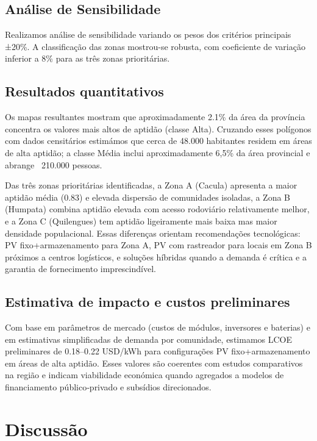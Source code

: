 \documentclass[12pt, a4paper]{article}
\begin{document}
\subsection{Análise de Sensibilidade}

Realizamos análise de sensibilidade variando os pesos dos critérios principais ±20\%. A classificação das zonas mostrou-se robusta, com coeficiente de variação inferior a 8\% para as três zonas prioritárias.

\subsection{Resultados quantitativos}

Os mapas resultantes mostram que aproximadamente 2.1\% da área da província concentra os valores mais altos de aptidão (classe Alta). Cruzando esses polígonos com dados censitários estimámos que cerca de 48.000 habitantes residem em áreas de alta aptidão; a classe Média inclui aproximadamente 6,5\% da área provincial e abrange ~210.000 pessoas.

Das três zonas prioritárias identificadas, a Zona A (Cacula) apresenta a maior aptidão média (0.83) e elevada dispersão de comunidades isoladas, a Zona B (Humpata) combina aptidão elevada com acesso rodoviário relativamente melhor, e a Zona C (Quilengues) tem aptidão ligeiramente mais baixa mas maior densidade populacional. Essas diferenças orientam recomendações tecnológicas: PV fixo+armazenamento para Zona A, PV com rastreador para locais em Zona B próximos a centros logísticos, e soluções híbridas quando a demanda é crítica e a garantia de fornecimento imprescindível.

\subsection{Estimativa de impacto e custos preliminares}

Com base em parâmetros de mercado (custos de módulos, inversores e baterias) e em estimativas simplificadas de demanda por comunidade, estimamos LCOE preliminares de 0.18–0.22 USD/kWh para configurações PV fixo+armazenamento em áreas de alta aptidão. Esses valores são coerentes com estudos comparativos na região e indicam viabilidade económica quando agregados a modelos de financiamento público‑privado e subsídios direcionados.

\section{Discussão}
\end{document}
